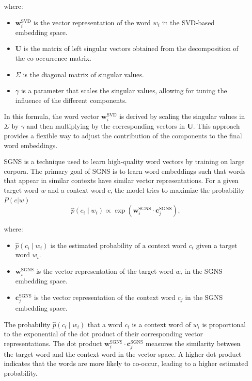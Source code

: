 where:
\begin{itemize}
    \item $\mathbf{w}_i^{\text{SVD}}$ is the vector representation of the word $w_i$ in the SVD-based embedding space.
    \item $\mathbf{U}$ is the matrix of left singular vectors obtained from the decomposition of the co-occurrence matrix.
    \item $\Sigma$ is the diagonal matrix of singular values.
    \item $\gamma$ is a parameter that scales the singular values, allowing for tuning the influence of the different components.
\end{itemize}

In this formula, the word vector $\mathbf{w}_i^{\text{SVD}}$ is derived by scaling the singular values in $\Sigma$ by $\gamma$ and then multiplying by the corresponding vectors in $\mathbf{U}$.
This approach provides a flexible way to adjust the contribution of the components to the final word embeddings.

SGNS is a technique used to learn high-quality word vectors by training on large corpora.
The primary goal of SGNS is to learn word embeddings such that words that appear in similar contexts have similar vector representations.
For a given target word $w$ and a context word $c$, the model tries to maximize the probability $P(c|w)$
\begin{equation}
\hat{p}(c_i \mid w_i) \propto \exp(\mathbf{w}_i^{\text{SGNS}} \cdot \mathbf{c}_j^{\text{SGNS}}),
\label{eq:sgns}
\end{equation}

where:
\begin{itemize}
    \item $\hat{p}(c_i \mid w_i)$ is the estimated probability of a context word $c_i$ given a target word $w_i$.
    \item $\mathbf{w}_i^{\text{SGNS}}$ is the vector representation of the target word $w_i$ in the SGNS embedding space.
    \item $\mathbf{c}_j^{\text{SGNS}}$ is the vector representation of the context word $c_j$ in the SGNS embedding space.
\end{itemize}

The probability $\hat{p}(c_i \mid w_i)$ that a word $c_i$ is a context word of $w_i$ is proportional to the exponential of the dot product of their corresponding vector representations.
The dot product $\mathbf{w}_i^{\text{SGNS}} \cdot \mathbf{c}_j^{\text{SGNS}}$ measures the similarity between the target word and the context word in the vector space.
A higher dot product indicates that the words are more likely to co-occur, leading to a higher estimated probability.

